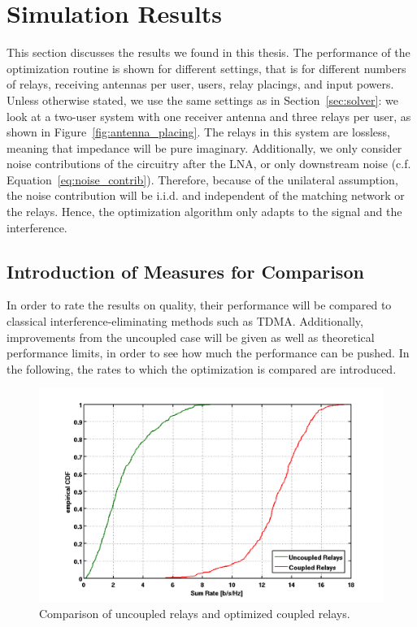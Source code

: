 \chapter{Simulation Results}
\label{sec:results}

This section discusses the results we found in this thesis.
The performance of the optimization routine is shown for different settings, that is for different numbers of relays, receiving antennas per user, users, relay placings, and input powers.
Unless otherwise stated, we use the same settings as in Section~\ref{sec:solver}: we look at a two-user system with one receiver antenna and three relays per user, as shown in Figure~\ref{fig:antenna_placing}.
The relays in this system are lossless, meaning that impedance will be pure imaginary.
Additionally, we only consider noise contributions of the circuitry after the LNA, or only downstream noise (c.f. Equation~\eqref{eq:noise_contrib}).
Therefore, because of the unilateral assumption, the noise contribution will be i.i.d. and independent of the matching network or the relays.
Hence, the optimization algorithm only adapts to the signal and the interference.

\section{Introduction of Measures for Comparison}
\label{sec:measures}
In order to rate the results on quality, their performance will be compared to classical interference-eliminating methods such as TDMA.
Additionally, improvements from the uncoupled case will be given as well as theoretical performance limits, in order to see how much the performance can be pushed.
In the following, the rates to which the optimization is compared are introduced.
\begin{figure}[h]
\centering
  \includegraphics[width=0.85\linewidth]{images/Coupledcomparison.png}
\caption{Comparison of uncoupled relays and optimized coupled relays.}
\label{fig:coupledcomparison}
\end{figure}

